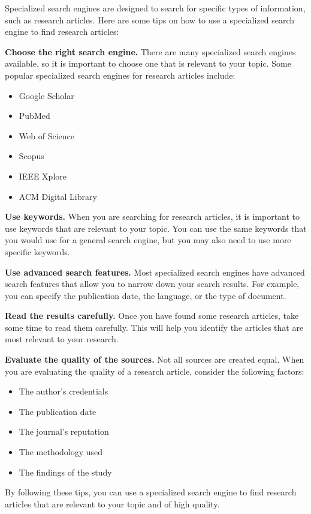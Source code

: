 \documentclass[
  b5paper]{book}
\begin{document}
Specialized search engines are designed to search for specific types of information, such as research articles. Here are some tips on how to use a specialized search engine to find research articles:

\textbf{Choose the right search engine.} There are many specialized search engines available, so it is important to choose one that is relevant to your topic. Some popular specialized search engines for research articles include:

\begin{itemize}
\item
  Google Scholar
\item
  PubMed
\item
  Web of Science
\item
  Scopus
\item
  IEEE Xplore
\item
  ACM Digital Library
\end{itemize}

\textbf{Use keywords.} When you are searching for research articles, it is important to use keywords that are relevant to your topic. You can use the same keywords that you would use for a general search engine, but you may also need to use more specific keywords.

\textbf{Use advanced search features.} Most specialized search engines have advanced search features that allow you to narrow down your search results. For example, you can specify the publication date, the language, or the type of document.

\textbf{Read the results carefully.} Once you have found some research articles, take some time to read them carefully. This will help you identify the articles that are most relevant to your research.

\textbf{Evaluate the quality of the sources.} Not all sources are created equal. When you are evaluating the quality of a research article, consider the following factors:

\begin{itemize}
\item
  The author's credentials
\item
  The publication date
\item
  The journal's reputation
\item
  The methodology used
\item
  The findings of the study
\end{itemize}

By following these tips, you can use a specialized search engine to find research articles that are relevant to your topic and of high quality.
\end{document}
